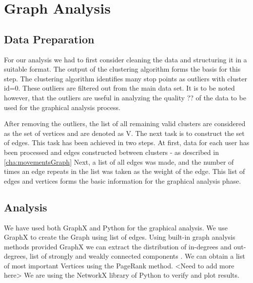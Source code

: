 \pagebreak


\section{Graph Analysis}
\subsection{Data Preparation}

 For our analysis we had to first consider cleaning the data and structuring it in a suitable format. The output of the clustering algorithm forms the basis for this step. The clustering algorithm identifies many stop points as outliers with cluster id=0. These outliers are filtered out from the main data set. It is to be noted however, that the outliers are useful in analyzing the quality ?? of the data to be used for the graphical analysis process.
 
After removing the outliers, the list of all remaining valid clusters are considered as the set of vertices and are denoted as V.
The next task is to construct the set of edges. This task has been achieved in two steps. At first, data for each user has been processed and edges constructed between clusters - as described in \autoref{cha:movementsGraph} Next, a list of all edges was made, and the number of times an edge repeats in the list was taken as the weight of the edge.
This list of edges and vertices forms the basic information for the graphical analysis phase.

\subsection{Analysis}
We have used both GraphX and Python for the graphical analysis.
We use GraphX to create the Graph using list of edges. Using built-in graph analysis methods provided GraphX we can extract the distribution of in-degrees and out-degrees, list of strongly and weakly connected components . We can obtain a list of most important Vertices using the PageRank method. <Need to add more here>
We are using the NetworkX library of Python to verify and plot results.









